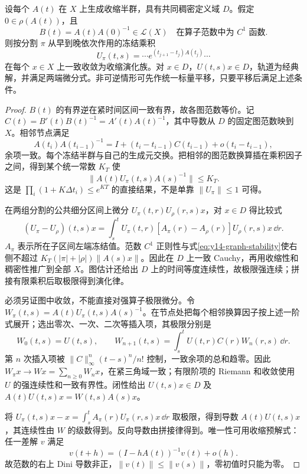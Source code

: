 \begin{theorem}[共同定义域的冻结乘积]\label{thm:y14-kato}
设每个 $A(t)$ 在 $X$ 上生成收缩半群，具有共同稠密定义域 $D$。假定 $0\in\rho(A(t))$，且
\[
 B(t)=A(t)A(0)^{-1}\in\mathcal L(X)
 \quad\text{在算子范数中为 }C^1\text{ 函数}.
\]
则按分割 $\pi$ 从早到晚依次作用的冻结乘积
\[
 U_\pi(t,s)=\cdots e^{(t_{j+1}-t_j)A(t_j)}\cdots
\]
在每个 $x\in X$ 上一致收敛为收缩演化族。对 $x\in D$，$U(t,s)x\in D$，轨道为经典解，并满足两端微分式。非可逆情形可先作统一标量平移，只要平移后满足上述条件。
\end{theorem}
\begin{proof}
$B(t)$ 的有界逆在紧时间区间一致有界，故各图范数等价。记 $C(t)=B'(t)B(t)^{-1}=A'(t)A(t)^{-1}$，其中导数从 $D$ 的固定图范数映到 $X$。相邻节点满足
\[
 A(t_i)A(t_{i-1})^{-1}=I+(t_i-t_{i-1})C(t_{i-1})+o(t_i-t_{i-1}),
\]
余项一致。每个冻结半群与自己的生成元交换。把相邻的图范数换算插在乘积因子之间，得到某个统一常数 $K_T$ 使
\begin{equation}\label{eq:y14-graph-stability}
 \|A(t)U_\pi(t,s)A(s)^{-1}\|\le K_T.
\end{equation}
这是 $\prod_i(1+K\Delta t_i)\le e^{KT}$ 的直接结果，不是单靠 $\|U_\pi\|\le1$ 可得。

在两组分割的公共细分区间上微分 $U_\pi(t,r)U_\rho(r,s)x$，对 $x\in D$ 得比较式
\[
 (U_\pi-U_\rho)(t,s)x
 =\int_s^tU_\pi(t,r)[A_\pi(r)-A_\rho(r)]U_\rho(r,s)x\,\dd r.
\]
$A_\pi$ 表示所在子区间左端冻结值。范数 $C^1$ 正则性与式\eqref{eq:y14-graph-stability}使右侧不超过 $K_T(|\pi|+|\rho|)\|A(s)x\|$。因此在 $D$ 上一致 Cauchy，再用收缩性和稠密性推广到全部 $X$。图估计还给出 $D$ 上的时间等度连续性，故极限强连续；拼接有限乘积后取极限得到演化律。

必须另证图中收敛，不能直接对强算子极限微分。令 $W_\pi(t,s)=A(t)U_\pi(t,s)A(s)^{-1}$。在节点处把每个相邻换算因子按上述一阶式展开；选出零次、一次、二次等插入项，其极限分别是
\[
 W_0(t,s)=U(t,s),\qquad
 W_{n+1}(t,s)=\int_s^tU(t,r)C(r)W_n(r,s)\,\dd r.
\]
第 $n$ 次插入项被 $\|C\|_\infty^n(t-s)^n/n!$ 控制，一致余项的总和趋零。因此 $W_\pi x\to Wx=\sum_{n\ge0}W_nx$，在紧三角域一致；有限阶项的 Riemann 和收敛使用 $U$ 的强连续性和一致有界性。闭性给出 $U(t,s)x\in D$ 及 $A(t)U(t,s)x=W(t,s)A(s)x$。

将 $U_\pi(t,s)x-x=\int_s^tA_\pi(r)U_\pi(r,s)x\,\dd r$ 取极限，得到导数 $A(t)U(t,s)x$，其连续性由 $W$ 的级数得到。反向导数由拼接律得到。唯一性可用收缩预解式：任一差解 $v$ 满足
\[
 v(t+h)=(I-hA(t))^{-1}v(t)+o(h).
\]
故范数的右上 Dini 导数非正，$\|v(t)\|\le\|v(s)\|$，零初值时只能为零。
\end{proof}

